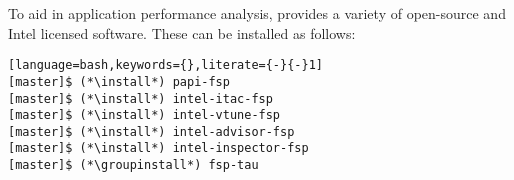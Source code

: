 To aid in application performance analysis, \FSP{} provides a variety of
open-source and Intel licensed software. These can be installed as follows:

\begin{lstlisting}[language=bash,keywords={},literate={-}{-}1]
[master]$ (*\install*) papi-fsp
[master]$ (*\install*) intel-itac-fsp
[master]$ (*\install*) intel-vtune-fsp
[master]$ (*\install*) intel-advisor-fsp
[master]$ (*\install*) intel-inspector-fsp
[master]$ (*\groupinstall*) fsp-tau
\end{lstlisting}
